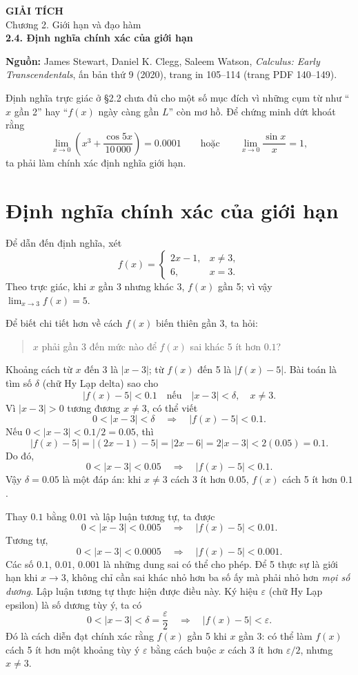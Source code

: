 \documentclass[12pt,a4paper]{article}
\begin{document}
\begin{center}
{\Large\bfseries GIẢI TÍCH}\\[5pt]
{\large Chương 2. Giới hạn và đạo hàm}\\[9pt]
{\Large\bfseries 2.4. Định nghĩa chính xác của giới hạn}
\end{center}
\noindent\textbf{Nguồn:} James Stewart, Daniel K. Clegg, Saleem Watson, \textit{Calculus: Early Transcendentals}, ấn bản thứ 9 (2020), trang in 105–114 (trang PDF 140–149).

Định nghĩa trực giác ở §2.2 chưa đủ cho một số mục đích vì những cụm từ như ``$x$ gần 2'' hay ``$f(x)$ ngày càng gần $L$'' còn mơ hồ. Để chứng minh dứt khoát rằng
\[\lim_{x\to0}\left(x^3+\frac{\cos5x}{10\,000}\right)=0.0001\qquad\text{hoặc}\qquad\lim_{x\to0}\frac{\sin x}{x}=1,\]
ta phải làm chính xác định nghĩa giới hạn.
\section*{Định nghĩa chính xác của giới hạn}
Để dẫn đến định nghĩa, xét
\[f(x)=\begin{cases}2x-1,&x\ne3,\\6,&x=3.\end{cases}\]
Theo trực giác, khi $x$ gần 3 nhưng khác 3, $f(x)$ gần 5; vì vậy $\lim_{x\to3}f(x)=5$.

Để biết chi tiết hơn về cách $f(x)$ biến thiên gần 3, ta hỏi:
\begin{quote}$x$ phải gần 3 đến mức nào để $f(x)$ sai khác 5 ít hơn $0.1$?\end{quote}
Khoảng cách từ $x$ đến 3 là $|x-3|$; từ $f(x)$ đến 5 là $|f(x)-5|$. Bài toán là tìm số $\delta$ (chữ Hy Lạp delta) sao cho
\[|f(x)-5|<0.1\quad\text{nếu}\quad |x-3|<\delta,\quad x\ne3.\]
Vì $|x-3|>0$ tương đương $x\ne3$, có thể viết
\[0<|x-3|<\delta\quad\Longrightarrow\quad |f(x)-5|<0.1.\]
Nếu $0<|x-3|<0.1/2=0.05$, thì
\[|f(x)-5|=|(2x-1)-5|=|2x-6|=2|x-3|<2(0.05)=0.1.\]
Do đó,
\[0<|x-3|<0.05\quad\Longrightarrow\quad |f(x)-5|<0.1.\]
Vậy $\delta=0.05$ là một đáp án: khi $x\ne3$ cách 3 ít hơn $0.05$, $f(x)$ cách 5 ít hơn $0.1$.

Thay $0.1$ bằng $0.01$ và lập luận tương tự, ta được
\[0<|x-3|<0.005\quad\Longrightarrow\quad |f(x)-5|<0.01.\]
Tương tự,
\[0<|x-3|<0.0005\quad\Longrightarrow\quad |f(x)-5|<0.001.\]
Các số $0.1$, $0.01$, $0.001$ là những dung sai có thể cho phép. Để 5 thực sự là giới hạn khi $x\to3$, không chỉ cần sai khác nhỏ hơn ba số ấy mà phải nhỏ hơn \textit{mọi số dương}. Lập luận tương tự thực hiện được điều này. Ký hiệu $\varepsilon$ (chữ Hy Lạp epsilon) là số dương tùy ý, ta có
\begin{equation}
0<|x-3|<\delta=\frac\varepsilon2\quad\Longrightarrow\quad |f(x)-5|<\varepsilon.\tag{1}
\end{equation}
Đó là cách diễn đạt chính xác rằng $f(x)$ gần 5 khi $x$ gần 3: có thể làm $f(x)$ cách 5 ít hơn một khoảng tùy ý $\varepsilon$ bằng cách buộc $x$ cách 3 ít hơn $\varepsilon/2$, nhưng $x\ne3$.
\end{document}
